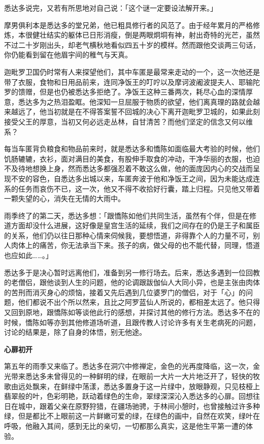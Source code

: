\documentclass[12pt,twoside,openany]{book}
\newcommand{\mt}[1]{\textbullet \textbf{#1}}
\begin{document}
悉达多说完，又若有所思地对自己说：「这个谜一定要设法解开来。」

摩男俱利本是悉达多的堂兄弟，他已粗具修行者的风范了。由于经年累月的严格修炼，本很健壮结实的躯体已日形消瘦，倒是两眼炯垌有神，射出奇特的光芒，虽然不过二十岁刚出头，却老气横秋地看似四五十岁的模样。然而跟他交谈两三句话，你仍能看到留在他眉宇间的稚气与天真。

迦毗罗卫国仍时常有人来探望他们，其中车匿是最常来走动的一个，这一次他还是带了衣服，食物和日用品前来，连同净饭王的叮咛以及摩诃波阇波提夫人、耶输陀罗的馈赠，但是也仍被悉达多拒绝了。净饭王这种三番两次，耗尽心血的深情厚意，悉达多为之热泪盈眶。他深知一旦屈服于物质的欲望，他们离真理的路就会越来越远了，他当初就是在不得答案誓不回城的决心下离开迦毗罗卫城的，如果此刻接受父王的厚意，当初又何必远走丛林，自甘清苦？而他们坚定的信念又何以维系？

每当车匿背负粮食和物品前来时，就是悉达多和憍陈如面临最大考验的时候，他们饥肠辘辘，衣衫，面对满目的美食，有股伸手取食的冲动，干净华丽的衣服，也迫不及待地想换上身，然而悉达多都强忍着不敢这么做，他的面庞因内心的交战而呈现不安的容色，自悉达多出城以来，车匿奔波于他和净饭王之间，因为未能达成连系的任务而哀伤不已，这一次，他又不得不收拾好行囊，踏上归程。只见他又带着一颗失望的心，消失在无情的大雨中。

雨季终了的第二天，悉达多想：「跟憍陈如他们共同生活，虽然有个伴，但是在修道方面却没什么进展，这好像是皇宫生活的延续，我们之间存在的仍是王子和属臣的关系，他们仍以往日那种心情来伺候我，要想悟道，非得靠个人的力量不可，别人肉体上的痛苦，你无法承当下来。孩子的病，做父母的也不能代替，同理，悟道也应如此……。」

悉达多于是决心暂时远离他们，准备到另一修行场去。后来，悉达多遇到一位回教的老僧侣，跟他谈到人生的问题，他的论调跟跋伽仙人大同小异，也是主张由肉体的苦刑而消灭身心的烦恼，接着又先后遇到几位婆罗门的僧侣，对于「心」的问题，他们都说不出个所以然来，且比之阿罗蓝仙人所说的，都相差太远了。他只得又回到原地，跟憍陈如等谈他此行的感想，并探讨其他的修行方法。悉达多不在的时候，憍陈如等亦到其他修道场听道，且跟传教人讨论许多有关生老病死的问题，讨论的结果是，除了自身的体悟，别无他途。

\mt{心扉初开}

第五年的雨季又来临了。悉达多在洞穴中修禅定，金色的光再度降临，这一次，金光带来悉达多未曾得见的一种鲜明的绿，在眼前一大片一大片地泛开了，轻快的牧歌由远处飘来，在鲜绿中荡漾，悉达多置身于这一片绿中，放眼静观，只见枝桠上翡翠般的叶，色彩明艳，跃动着绿色的生命，翠绿深深沁入悉达多的心扉。回想往日在城中，跟着父亲在原野狩猎，在疆场驰骋，于林间小憩时，也曾接触过许多种绿，但是都比不上眼前这一片鲜嫩可爱的绿，在绿色的画中，自然在欢笑，绿叶在呼吸，他融入其间，感到无比的亲切，一切都那么真实，这是他生平第一遭的体验。
\end{document}
